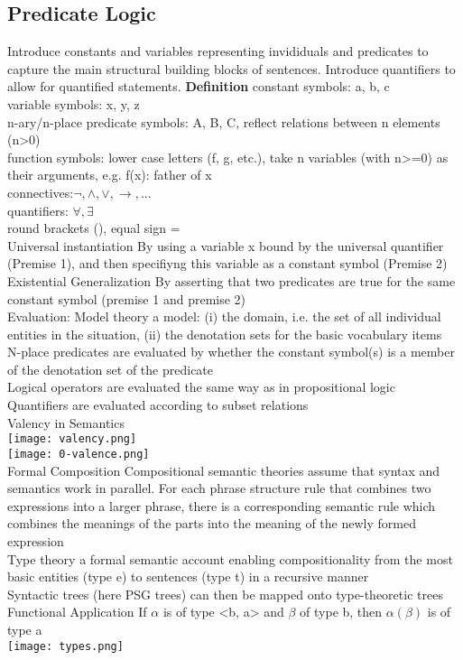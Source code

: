 \subsection*{Predicate Logic}
{\tiny Introduce constants and variables representing invididuals and predicates to capture the main structural building blocks of sentences. Introduce quantifiers to allow for quantified statements.}
\textbf{Definition}
{\tiny constant symbols: a, b, c\\
variable symbols: x, y, z\\
n-ary/n-place predicate symbols: A, B, C, reflect relations between n elements (n>0)\\
function symbols: lower case letters (f, g, etc.), take n variables (with n>=0) as their arguments, e.g. f(x): father of x\\
connectives:$\neg, \land, \lor, \to, ...$ \\
quantifiers: $\forall, \exists$ \\
round brackets (), equal sign =}\\
Universal instantiation {\tiny By using a variable x bound by the universal quantifier (Premise 1), and then specifiyng this variable as a constant symbol (Premise 2)}\\
Existential Generalization {\tiny By asserting that two predicates are true for the same constant symbol (premise 1 and premise 2)}\\
Evaluation: Model theory {\tiny a model: (i) the domain, i.e. the set of all individual entities in the situation, (ii) the denotation sets for the basic vocabulary items\\
N-place predicates are evaluated by whether the constant symbol(s) is a member of the denotation set of the predicate\\
Logical operators are evaluated the same way as in propositional logic\\
Quantifiers are evaluated according to subset relations
}\\
Valency in Semantics\\
\texttt{[image: valency.png]}\\
\texttt{[image: 0-valence.png]}\\
Formal Composition {\tiny Compositional semantic theories assume that syntax and semantics work in parallel. For each phrase structure rule that combines two expressions into a larger phrase, there is a corresponding semantic rule which combines the meanings of the parts into the meaning of the newly formed expression}\\
Type theory {\tiny a formal semantic account enabling compositionality from the most basic entities (type e) to sentences (type t) in a recursive manner\\
Syntactic trees (here PSG trees) can then be mapped onto type-theoretic trees
}\\
Functional Application {\tiny If $\alpha$ is of type <b, a> and $\beta$ of type b, then $\alpha(\beta)$ is of type a}\\
\texttt{[image: types.png]}\\
